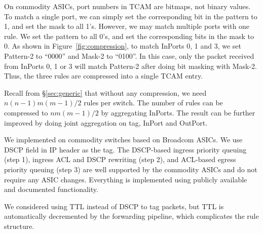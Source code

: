 On commodity ASICs, port numbers in TCAM are bitmaps, not binary values. To match a single 
port, we can simply set the corresponding bit in the pattern to 1, and set the mask to all 1's. 
However, we may match multiple ports with one rule. We set the pattern to 
all 0's, and set the corresponding bits in the mask to 0. As shown in Figure~\ref{fig:compression},  
to match InPorts 0, 1 and 3, we set Pattern-2 to ``0000''  and Mask-2 to ``0100''. In this case, 
only the packet received from InPorts 0, 1 or 3 will match Pattern-2 after doing bit masking with Mask-2. 
Thus, the three rules are compressed into a single TCAM entry.

Recall from \S\ref{sec:generic} that without any compression, we need
$n(n-1)m(m-1)/2$ rules per switch. The number of rules can be
compressed to $nm(m-1)/2$ by aggregating InPorts.  The
result can be further improved by doing joint aggregation on tag, InPort and
OutPort.

 We implemented \sysname{} on commodity
switches based on Broadcom ASICs.  We use DSCP field in IP header as the tag.
The DSCP-based ingress priority queuing (step 1), ingress ACL and DSCP rewriting (step 2),
and ACL-based egress priority queuing (step 3) are well supported by the
commodity ASICs and do not require any ASIC changes. 
Everything is implemented using publicly available and documented
functionality.




We considered using TTL instead of DSCP to tag packets, but TTL is automatically 
decremented by the forwarding pipeline, which complicates the rule structure.

